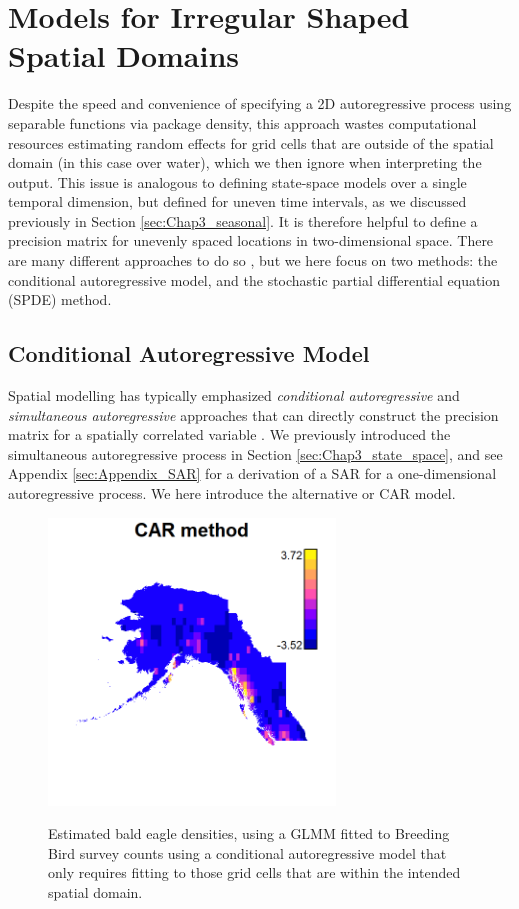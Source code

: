 \section{Models for Irregular Shaped Spatial Domains} \label{sec:Chap5_irregular_spatial_covariance}

Despite the speed and convenience of specifying a 2D autoregressive process using separable functions via package \colorbox{backblue}{density}, this approach  wastes computational resources estimating random effects for grid cells that are outside of the spatial domain (in this case over water), which we then ignore when interpreting the output.  This issue is analogous to defining state-space models over a single temporal dimension, but defined for uneven time intervals, as we discussed previously in Section \ref{sec:Chap3_seasonal}.  It is therefore helpful to define a precision matrix for unevenly spaced locations in two-dimensional space. There are many different approaches to do so \cite{vecchia_estimation_1988}, but we here focus on two methods: the conditional autoregressive model, and the stochastic partial differential equation (SPDE) method. 

\subsection{Conditional Autoregressive Model} \label{sec:Chap5_CAR}

Spatial modelling has typically emphasized \textit{conditional autoregressive} and \textit{simultaneous autoregressive} approaches that can directly construct the precision matrix for a spatially correlated variable \cite{cressie_statistics_1993}.  We previously introduced the simultaneous autoregressive process in Section \ref{sec:Chap3_state_space}, and see Appendix \ref{sec:Appendix_SAR} for a derivation of a SAR for a one-dimensional autoregressive process.  We here introduce the alternative  or CAR model.  

\begin{figure}[!ht]
    \caption[Estimates of eagle densities using conditional autoregressive model]{Estimated bald eagle densities, using a GLMM fitted to Breeding Bird survey counts using a conditional autoregressive model that only requires fitting to those grid cells that are within the intended spatial domain.}
    \centering
    \includegraphics[width=3in]{Chap_5/Mapped_densities--CAR.png}
    \label{fig:Chap5_CAR_densities}
\end{figure}

